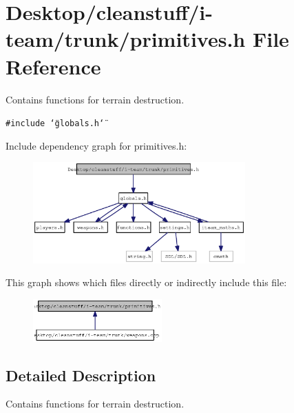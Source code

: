 \section{Desktop/cleanstuff/i-team/trunk/primitives.h File Reference}
\label{primitives_8h}
Contains functions for terrain destruction. 

{\tt \#include \char`\"{}globals.h\char`\"{}}\par


Include dependency graph for primitives.h:\nopagebreak
\begin{figure}[H]
\begin{center}
\leavevmode
\includegraphics[width=231pt]{primitives_8h__incl}
\end{center}
\end{figure}


This graph shows which files directly or indirectly include this file:\nopagebreak
\begin{figure}[H]
\begin{center}
\leavevmode
\includegraphics[width=140pt]{primitives_8h__dep__incl}
\end{center}
\end{figure}


\subsection{Detailed Description}
Contains functions for terrain destruction. 

